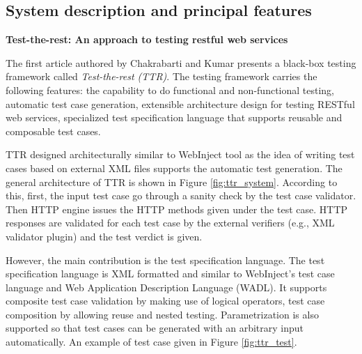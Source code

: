 \documentclass[english]{tktltiki}
\begin{document}
\subsection{System description and principal features}
\textbf{Test-the-rest: An approach to testing restful web services} 

The first article authored by Chakrabarti and Kumar \cite{chakrabarti2009test} presents a black-box testing framework called \textit{Test-the-rest (TTR)}. The testing framework carries the following features: the capability to do functional and non-functional testing, automatic test case generation, extensible architecture design for testing RESTful web services, specialized test specification language that supports reusable and composable test cases.

TTR designed architecturally similar to WebInject \cite{webinject} tool as the idea of writing test cases based on external XML files supports the automatic test generation. The general architecture of TTR is shown in Figure \ref{fig:ttr_system}. According to this, first, the input test case go through a sanity check by the test case validator. Then HTTP engine issues the HTTP methods given under the test case. HTTP responses are validated for each test case by the external verifiers (e.g., XML validator plugin) and the test verdict is given. 

However, the main contribution is the test specification language. The test specification language is XML formatted and similar to WebInject's test case language and Web Application Description Language (WADL). It supports composite test case validation by making use of logical operators, test case composition by allowing reuse and nested testing. Parametrization is also supported so that test cases can be generated with an arbitrary input automatically. An example of test case given in Figure \ref{fig:ttr_test}.
\end{document}
